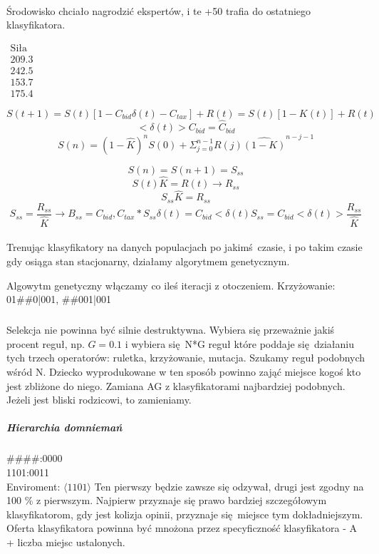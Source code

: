 \documentclass{article}
\begin{document}
		\paragraph{} Środowisko chciało nagrodzić ekspertów, i te +50 trafia do ostatniego klasyfikatora.
		
		\begin{center}
	$	\begin{array}{c}
			\text{Siła} \\ 
			209.3 \\ 
			242.5 \\ 
			153.7 \\ 
			175.4
			\end{array} $
		\end{center}
			
		$$S(t+1)=S(t)[1 - C_{bid}\delta(t)-C_{tax}]+R(t)=
		S(t)[1-K(t)] + R(t)$$
		$$<\delta (t)>C_{bid}=\hat{C}_{bid}$$
		$$S(n) = (1-\hat{K})^nS(0)+\Sigma^{n-1}_{j=0}R(j)\hat{(1-K)}^{n-j-1}$$
		
		$$S(n)=S(n+1)=S_{ss}$$
		$$S(t)\hat{K} = R(t) \rightarrow R_{ss}$$
		$$S_{ss}\hat{K}= R_{ss}$$
		$$S_{ss}=\frac{R_{ss}}{\hat{K}} \rightarrow 
		B_{ss}=C_{bid}, C_{tax}* S_{ss}\delta(t)=C_{bid}<\delta(t)S_{ss}=C_{bid}<\delta(t)>\frac{R_{ss}}{\hat{K}}$$
		
		\paragraph{}Trenując klasyfikatory na danych populacjach po jakimś czasie, i po takim czasie gdy osiąga stan stacjonarny, działamy algorytmem genetycznym.
		
		Algowytm genetyczny włączamy co ileś iteracji z otoczeniem.
		Krzyżowanie: 01\#\#0|001, \#\#001|001
		\subparagraph{}Selekcja nie powinna być silnie destruktywna. Wybiera się przeważnie jakiś procent reguł, np. $G = 0.1$ i wybiera się N*G reguł które poddaje się działaniu tych trzech operatorów: ruletka, krzyżowanie, mutacja. Szukamy reguł podobnych wśród N. Dziecko wyprodukowane w ten sposób powinno zająć miejsce kogoś kto jest zbliżone do niego. Zamiana AG z klasyfikatorami najbardziej podobnych. Jeżeli jest bliski rodzicowi, to zamieniamy.
		\subparagraph{Hierarchia domniemań}
		\#\#\#\#:0000\\
		1101:0011	\\
		Enviroment: $\langle 1101 \rangle$
		Ten pierwszy będzie zawsze się odzywał, drugi jest zgodny na 100 \% z pierwszym. Najpierw przyznaje się prawo bardziej szczegółowym klasyfikatorom, gdy jest kolizja opinii, przyznaje się miejsce tym dokładniejszym. Oferta klasyfikatora powinna być mnożona przez specyficzność klasyfikatora - A + liczba miejsc ustalonych.
		
\end{document}
